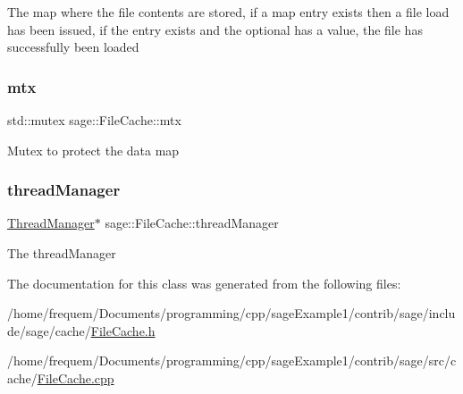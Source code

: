 The map where the file contents are stored, if a map entry exists then a file load has been issued, if the entry exists and the optional has a value, the file has successfully been loaded \mbox{\label{classsage_1_1FileCache_a1bbc9aebae036d04a6eef1f74d535d5a}} 
\subsubsection{\texorpdfstring{mtx}{mtx}}
{\footnotesize\ttfamily std\+::mutex sage\+::\+File\+Cache\+::mtx\hspace{0.3cm}{\ttfamily [private]}}

Mutex to protect the data map \mbox{\label{classsage_1_1FileCache_a02a6333cfba88c7e03a5952c23e253d9}} 
\subsubsection{\texorpdfstring{threadManager}{threadManager}}
{\footnotesize\ttfamily \mbox{\hyperlink{classsage_1_1ThreadManager}{Thread\+Manager}}$\ast$ sage\+::\+File\+Cache\+::thread\+Manager\hspace{0.3cm}{\ttfamily [private]}}

The thread\+Manager 

The documentation for this class was generated from the following files\+:\begin{DoxyCompactItemize}
\item 
/home/frequem/\+Documents/programming/cpp/sage\+Example1/contrib/sage/include/sage/cache/\mbox{\hyperlink{FileCache_8h}{File\+Cache.\+h}}\item 
/home/frequem/\+Documents/programming/cpp/sage\+Example1/contrib/sage/src/cache/\mbox{\hyperlink{FileCache_8cpp}{File\+Cache.\+cpp}}\end{DoxyCompactItemize}
